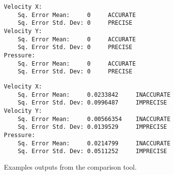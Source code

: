 \begin{figure}[ht]
    \centering
    \begin{center}
\begin{minipage}{0.4\textwidth}\begin{verbatim}
Velocity X:
    Sq. Error Mean:     0     ACCURATE
    Sq. Error Std. Dev: 0     PRECISE
Velocity Y:
    Sq. Error Mean:     0     ACCURATE
    Sq. Error Std. Dev: 0     PRECISE
Pressure:
    Sq. Error Mean:     0     ACCURATE
    Sq. Error Std. Dev: 0     PRECISE
\end{verbatim}
\end{minipage}%
\hspace{0.02\textwidth}
\begin{minipage}{0.5\textwidth}\begin{verbatim}
Velocity X:
    Sq. Error Mean:     0.0233842     INACCURATE
    Sq. Error Std. Dev: 0.0996487     IMPRECISE
Velocity Y:
    Sq. Error Mean:     0.00566354    INACCURATE
    Sq. Error Std. Dev: 0.0139529     IMPRECISE
Pressure:
    Sq. Error Mean:     0.0214799     INACCURATE
    Sq. Error Std. Dev: 0.0511252     IMPRECISE
\end{verbatim}
%
\end{minipage}
\end{center}
    
    
    \caption{Examples outputs from the comparison tool.}
    \label{fig:example_comparisons}
\end{figure}